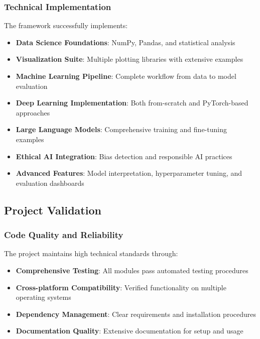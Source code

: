 \subsubsection{Technical Implementation}

The framework successfully implements:

\begin{itemize}
    \item \textbf{Data Science Foundations}: NumPy, Pandas, and statistical analysis
    \item \textbf{Visualization Suite}: Multiple plotting libraries with extensive examples
    \item \textbf{Machine Learning Pipeline}: Complete workflow from data to model evaluation
    \item \textbf{Deep Learning Implementation}: Both from-scratch and PyTorch-based approaches
    \item \textbf{Large Language Models}: Comprehensive training and fine-tuning examples
    \item \textbf{Ethical AI Integration}: Bias detection and responsible AI practices
    \item \textbf{Advanced Features}: Model interpretation, hyperparameter tuning, and evaluation dashboards
\end{itemize}

\subsection{Project Validation}

\subsubsection{Code Quality and Reliability}

The project maintains high technical standards through:

\begin{itemize}
    \item \textbf{Comprehensive Testing}: All modules pass automated testing procedures
    \item \textbf{Cross-platform Compatibility}: Verified functionality on multiple operating systems
    \item \textbf{Dependency Management}: Clear requirements and installation procedures
    \item \textbf{Documentation Quality}: Extensive documentation for setup and usage
\end{itemize}

